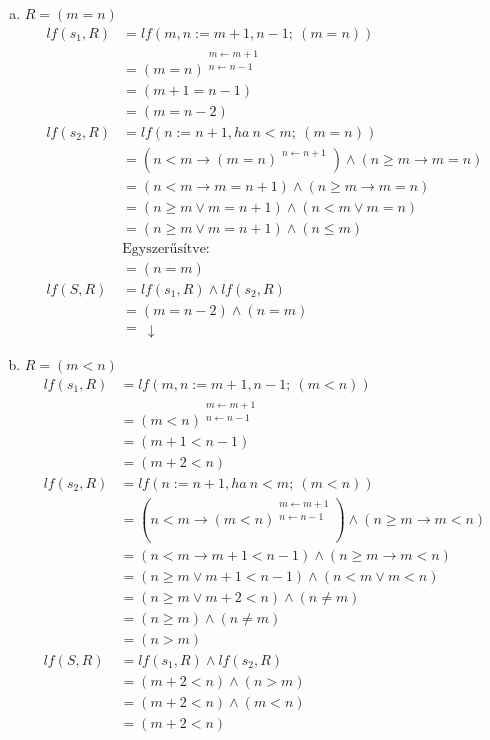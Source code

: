 \documentclass[12pt]{article}
\begin{document}
\begin{enumerate}
		\begin{enumerate}[a)]
			\item $R = (m = n)$
			\begin{align*}
			lf(s_1, R) &= lf(m,n := m+1, n-1;\ (m = n)) \\
			&= (m = n)^{\substack{ m \leftarrow m + 1 \\ n \leftarrow n - 1 }} \\
			&= (m+1 = n-1) \\
			&= (m = n-2) \\
			lf(s_2, R) &= lf(n := n + 1, ha\ n < m;\ (m = n)) \\
			&= (n < m \rightarrow (m = n)^{\substack{ n \leftarrow n + 1 }}) \land (n \ge m \rightarrow m = n) \\
			&= (n < m \rightarrow m = n + 1) \land (n \ge m \rightarrow m = n) \\
			&= (n \ge m \lor m = n + 1) \land (n < m \lor m = n) \\
			&= (n \ge m \lor m = n + 1) \land (n \leq m) \\
			&\text{Egyszerűsítve: } \\
			&= (n = m) \\
			lf(S, R) &= lf(s_1, R) \land lf(s_2, R) \\
			&= (m = n-2) \land (n = m) \\
			&=\ \downarrow
			\end{align*}
			\item $R = (m < n)$
			\begin{align*}
			lf(s_1, R) &= lf(m,n := m+1, n-1;\ (m < n)) \\
			&= (m < n)^{\substack{ m \leftarrow m + 1 \\ n \leftarrow n - 1 }} \\
			&= (m+1 < n-1) \\
			&= (m+2 < n) \\
			lf(s_2, R) &= lf(n := n + 1, ha\ n < m;\ (m < n)) \\
			&= (n < m \rightarrow (m < n)^{\substack{ m \leftarrow m + 1 \\ n \leftarrow n - 1 }}) \land (n \ge m \rightarrow m < n) \\
			&= (n < m \rightarrow m + 1 < n - 1) \land (n \ge m \rightarrow m < n) \\
			&= (n \ge m \lor m + 1 < n - 1) \land (n < m \lor m < n) \\
			&= (n \ge m \lor m + 2 < n) \land (n \neq m) \\
			&= (n \ge m) \land (n \neq m) \\
			&= (n > m) \\
			lf(S, R) &= lf(s_1, R) \land lf(s_2, R) \\
			&= (m+2 < n) \land (n > m) \\
			&= (m+2 < n) \land (m < n) \\
			&= (m+2 < n)
			\end{align*}
		\end{enumerate}
	\end{enumerate}
	
\end{document}

